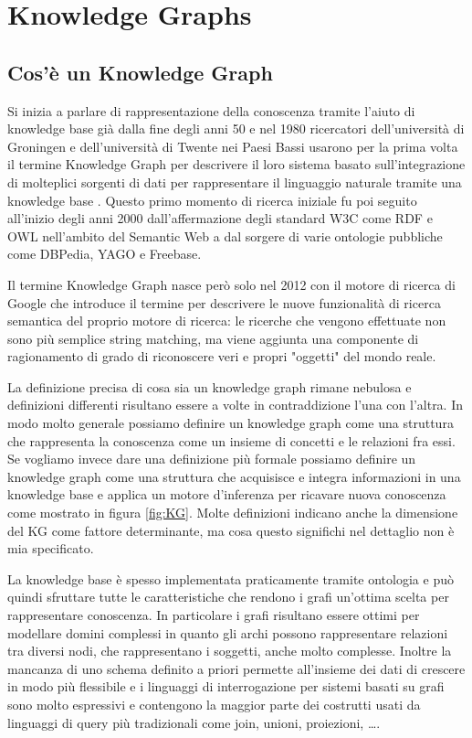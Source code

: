 \chapter{Knowledge Graphs}
\label{cha:vkg}

\section{Cos'è un Knowledge Graph}
\label{sec:kg_description}

Si inizia a parlare di rappresentazione della conoscenza tramite l'aiuto di knowledge base già dalla fine degli anni 50 e nel 1980 ricercatori dell'università di Groningen 
e dell'università di Twente nei Paesi Bassi usarono per la prima volta il termine Knowledge Graph per descrivere il loro sistema basato sull'integrazione di molteplici sorgenti
di dati per rappresentare il linguaggio naturale tramite una knowledge base .
Questo primo momento di ricerca iniziale fu poi seguito all'inizio degli anni 2000 dall'affermazione degli standard W3C come RDF e OWL nell'ambito del 
Semantic Web a dal sorgere di varie ontologie pubbliche come DBPedia, YAGO e Freebase. \cite{KGDefinition} \cite{KGSurvey}

Il termine Knowledge Graph nasce però solo nel 2012 con il motore di ricerca di Google che introduce il termine per descrivere
le nuove funzionalità di ricerca semantica del proprio motore di ricerca: le ricerche che vengono effettuate non sono più semplice string matching,
ma viene aggiunta una componente di ragionamento di grado di riconoscere veri e propri "oggetti" del mondo reale. \cite{KGDefinition}

La definizione precisa di cosa sia un knowledge graph rimane nebulosa e definizioni differenti risultano essere a volte in contraddizione l'una con l'altra. 
In modo molto generale possiamo definire un knowledge graph come una struttura che rappresenta la conoscenza come un insieme di concetti e le relazioni fra essi.
Se vogliamo invece dare una definizione più formale possiamo definire un knowledge graph come una struttura che acquisisce e integra informazioni in una knowledge base
e applica un motore d'inferenza per ricavare nuova conoscenza come mostrato in figura \ref{fig:KG}.
Molte definizioni indicano anche la dimensione del KG come fattore determinante, ma cosa questo significhi nel dettaglio non è mia specificato.

La knowledge base è spesso implementata praticamente tramite ontologia e può quindi sfruttare tutte le caratteristiche che rendono i grafi un'ottima scelta per rappresentare 
conoscenza. In particolare i grafi risultano essere ottimi per modellare domini complessi in quanto gli archi possono rappresentare relazioni tra diversi nodi, che rappresentano 
i soggetti, anche molto complesse. Inoltre la mancanza di uno schema definito a priori permette all'insieme dei dati di crescere in modo più flessibile e i linguaggi di interrogazione
per sistemi basati su grafi sono molto espressivi e contengono la maggior parte dei costrutti usati da linguaggi di query più tradizionali come join, unioni, proiezioni, \dots \cite{KGIntro}.

